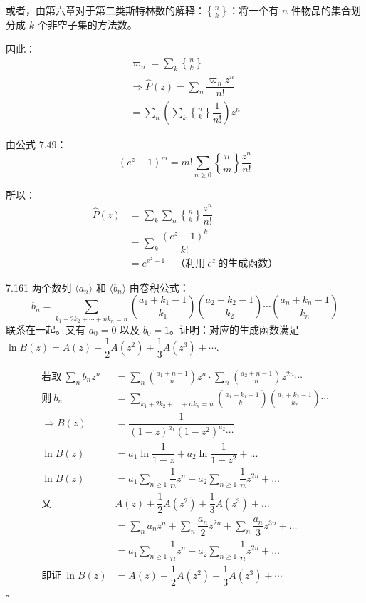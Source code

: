 或者，由第六章对于第二类斯特林数的解释：\( \genfrac{\{}{\}}{0pt}{} {n}{k} \)：将一个有 \( n \) 件物品的集合划分成 \( k \) 个非空子集的方法数。

因此：
\begin{gather*}
  \varpi_n = \sum_k \genfrac{\{}{\}}{0pt}{} {n}{k} \\
  \Rightarrow \hat{P}(z) = \sum_n \dfrac{\varpi_n z^n}{n!} \\
  = \sum_n \left( \sum_k \genfrac{\{}{\}}{0pt}{} {n}{k} \dfrac{1}{n!} \right) z^n
\end{gather*}

由公式 \( 7.49 \)：
\[
  \boxed{(e^z - 1)^m = m! \sum_{n \geqslant 0} \genfrac{\{}{\}}{0pt}{} {n}{m} \dfrac{z^n}{n!}}
\]

所以：
\begin{align*}
  \hat{P}(z) &= \sum_k \sum_n \genfrac{\{}{\}}{0pt}{} {n}{k} \dfrac{z^n}{n!} \\
  &= \sum_k \dfrac{(e^z - 1)^k}{k!} \\
  &= e^{e^z - 1} \quad \text{（利用} \ e^z \ \text{的生成函数）}
\end{align*}

\begin{problem}{7.16}{1}
  两个数列 \( \langle a_n \rangle \) 和 \( \langle b_n \rangle \) 由卷积公式：
  \[
    b_n = \sum_{k_1 + 2k_2 + \cdots + nk_n = n} \binom{a_1 + k_1 - 1}{k_1} \binom{a_2 + k_2 - 1}{k_2} \cdots \binom{a_n + k_n - 1}{k_n}
  \]
  联系在一起。又有 \( a_0 = 0 \) 以及 \( b_0 = 1 \)。证明：对应的生成函数满足 \( \ln{B(z)} = A(z) + \dfrac{1}{2} A(z^2) + \dfrac{1}{3} A(z^3) + \cdots \).
\end{problem}

\begin{align*}
  \text{若取} \ \sum_n b_n z^n &= \sum_n \binom{a_1 + n - 1}{n} z^n \cdot \sum_n \binom{a_2 + n - 1}{n} z^{2n} \cdots \\
  \text{则} \ b_n &= \sum_{k_1 + 2 k_2 + \dots + n k_n = n} \binom{a_1 + k_1 - 1}{k_1} \binom{a_2 + k_2 - 1}{k_2} \cdots \\
  \Rightarrow B(z) &= \dfrac{1}{(1-z)^{a_1} (1-z^2)^{a_2} \cdots} \\
  \ln{B(z)} &= a_1 \ln{\dfrac{1}{1-z}} + a_2 \ln{\dfrac{1}{1-z^2}} + \dots \\
  \ln{B(z)} &= a_1 \sum_{n \geqslant 1} \dfrac{1}{n} z^n + a_2 \sum_{n \geqslant 1} \dfrac{1}{n} z^{2n} + \dots \\
  \text{又} \ &A(z) + \dfrac{1}{2} A(z^2) + \dfrac{1}{3} A(z^3) + \dots \\
  &= \sum_n a_n z^n + \sum_n \dfrac{a_n}{2} z^{2n} + \sum_n \dfrac{a_n}{3} z^{3n} + \dots \\
  &= a_1 \sum_{n \geqslant 1} \dfrac{1}{n} z^n + a_2 \sum_{n \geqslant 1} \dfrac{1}{n} z^{2n} + \dots \\
  \text{即证} \ \ln{B(z)} &= A(z) + \dfrac{1}{2} A(z^2) + \dfrac{1}{3} A(z^3) + \cdots
\end{align*}
\hfill \( \square \)


